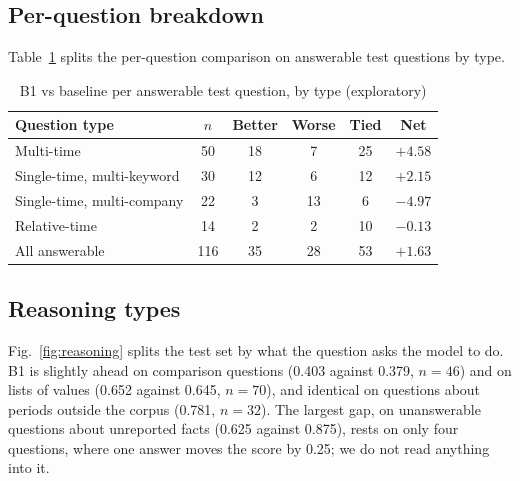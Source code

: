 \begin{table}[t]
\centering
\caption{Secondary comparisons (test set)}
\label{tab:pairs}
\end{table}

\subsection{Per-question breakdown}
Table~\ref{tab:types} splits the per-question comparison on answerable test questions by type.

\begin{table}[t]
\centering
\caption{B1 vs baseline per answerable test question, by type (exploratory)}
\label{tab:types}
\begin{tabular}{lccccc}
\toprule
Question type & $n$ & Better & Worse & Tied & Net \\
\midrule
Multi-time & 50 & 18 & 7 & 25 & $+4.58$ \\
Single-time, multi-keyword & 30 & 12 & 6 & 12 & $+2.15$ \\
Single-time, multi-company & 22 & 3 & 13 & 6 & $-4.97$ \\
Relative-time & 14 & 2 & 2 & 10 & $-0.13$ \\
\midrule
All answerable & 116 & 35 & 28 & 53 & $+1.63$ \\
\bottomrule
\end{tabular}
\end{table}

\ifextended
\subsection{Reasoning types}
Fig.~\ref{fig:reasoning} splits the test set by what the question asks the model to do. B1 is slightly ahead on comparison questions (0.403 against 0.379, $n = 46$) and on lists of values (0.652 against 0.645, $n = 70$), and identical on questions about periods outside the corpus (0.781, $n = 32$). The largest gap, on unanswerable questions about unreported facts (0.625 against 0.875), rests on only four questions, where one answer moves the score by 0.25; we do not read anything into it.

